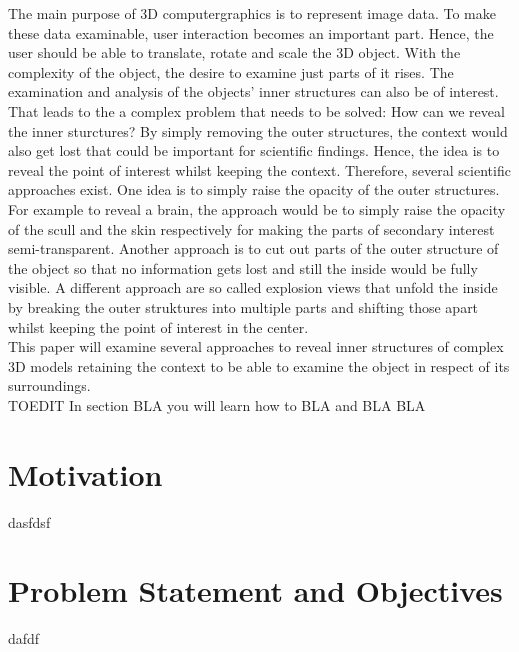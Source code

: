 

The main purpose of 3D computergraphics is to represent image data. To make these data examinable, user interaction becomes an important part. Hence, the user should be able to translate, rotate and scale the 3D object. With the complexity of the object, the desire to examine just parts of it rises. The examination and analysis of the objects' inner structures can also be of interest. That leads to the a complex problem that needs to be solved: How can we reveal the inner sturctures? By simply removing the outer structures, the context would also get lost that could be important for scientific findings. Hence, the idea is to reveal the point of interest whilst keeping the context. Therefore, several scientific approaches exist. One idea is to simply raise the opacity of the outer structures. For example to reveal a brain, the approach would be to simply raise the opacity of the scull and the skin respectively for making the parts of secondary interest semi-transparent. Another approach is to cut out parts of the outer structure of the object so that no information gets lost and still the inside would be fully visible. A different approach are so called explosion views that unfold the inside by breaking the outer struktures into multiple parts and shifting those apart whilst keeping the point of interest in the center.\\

This paper will examine several approaches to reveal inner structures of complex 3D models retaining the context to be able to examine the object in respect of its surroundings.\\
TOEDIT In section BLA you will learn how to BLA and BLA BLA

\section{Motivation}
dasfdsf

\section{Problem Statement and Objectives}
dafdf